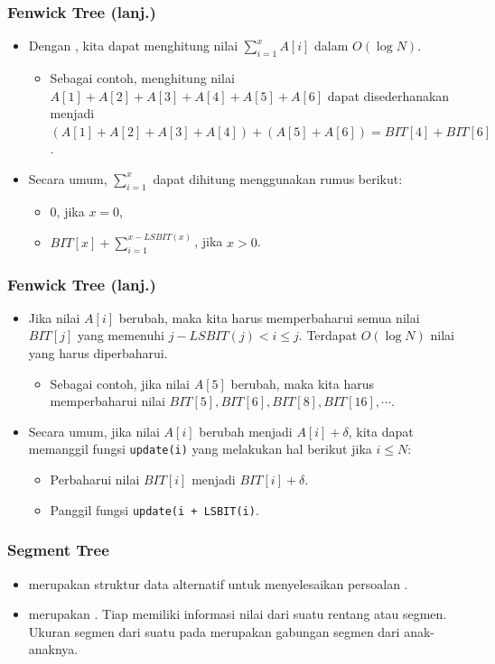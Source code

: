 \begin{frame}
\frametitle{Fenwick Tree (lanj.)}
\begin{itemize}
  \item Dengan \ffenwickTree, kita dapat menghitung nilai $\sum_{i=1}^{x} A[i]$ dalam $O(\log N)$.
  \begin{itemize}
    \item Sebagai contoh, menghitung nilai $A[1] + A[2] + A[3] + A[4] + A[5] + A[6]$ dapat disederhanakan menjadi $(A[1] + A[2] + A[3] + A[4]) + (A[5] + A[6]) = BIT[4] + BIT[6]$.
  \end{itemize}
  \item Secara umum, $\sum_{i=1}^{x}$ dapat dihitung menggunakan rumus berikut:
  \begin{itemize}
    \item $0$, jika $x = 0$,
    \item $BIT[x] + \sum_{i=1}^{x - LSBIT(x)}$, jika $x > 0$.
  \end{itemize}
\end{itemize}
\end{frame}

\begin{frame}
\frametitle{Fenwick Tree (lanj.)}
\begin{itemize}
  \item Jika nilai $A[i]$ berubah, maka kita harus memperbaharui semua nilai $BIT[j]$ yang memenuhi $j - LSBIT(j) < i \leq j$. Terdapat $O(\log N)$ nilai yang harus diperbaharui.
  \begin{itemize}
    \item Sebagai contoh, jika nilai $A[5]$ berubah, maka kita harus memperbaharui nilai $BIT[5], BIT[6], BIT[8], BIT[16], \cdots$.
  \end{itemize}
  \item Secara umum, jika nilai $A[i]$ berubah menjadi $A[i] + \delta$, kita dapat memanggil fungsi \lstinline{update(i)} yang melakukan hal berikut jika $i \leq N$:
  \begin{itemize}
    \item Perbaharui nilai $BIT[i]$ menjadi $BIT[i] + \delta$.
    \item Panggil fungsi \lstinline{update(i + LSBIT(i)}.
  \end{itemize}
\end{itemize}
\end{frame}

\begin{frame}
\frametitle{Segment Tree}
\begin{itemize}
  \item {} merupakan struktur data alternatif untuk menyelesaikan persoalan \frangeSumQuery.
  \item \fSegmentTree merupakan \fbinaryTree. Tiap \fnode memiliki informasi nilai dari suatu rentang atau segmen. Ukuran segmen dari suatu \fnode pada \fsegmentTree merupakan gabungan segmen dari anak-anaknya.
\end{itemize}
\end{frame}

